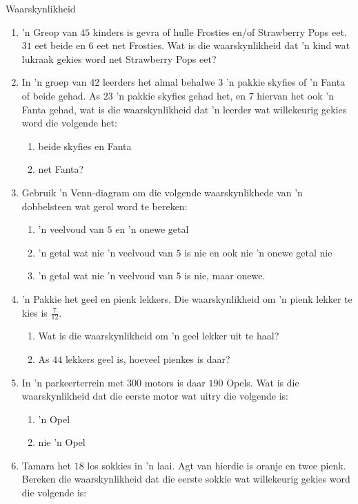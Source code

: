 \begin{eoexercises}{Waarskynlikheid}
  \begin{enumerate}[itemsep=5pt, label=\textbf{\arabic*}]
  \item 'n Greop van $45$ kinders is gevra of hulle  Frosties en/of
    Strawberry Pops eet. $31$ eet beide en $6$ eet net Frosties.  Wat is die waarskynlikheid dat 'n kind wat lukraak gekies word net Strawberry
    Pops eet?
  \item In 'n groep van $42$ leerders het almal behalwe $3$ 'n pakkie skyfies of 'n Fanta of beide gehad. As $23$ 'n pakkie skyfies gehad het, en $7$ hiervan het ook 'n Fanta gehad, wat is die waarskynlikheid dat 'n leerder wat willekeurig gekies word die volgende het:
    \begin{enumerate}
    \item beide skyfies en Fanta
    \item net Fanta?
    \end{enumerate}
  \item Gebruik 'n Venn-diagram om die volgende waarskynlikhede van 'n dobbelsteen wat gerol word te bereken:
    \begin{enumerate}
    \item 'n veelvoud van $5$ en 'n onewe getal
    \item 'n getal wat nie 'n veelvoud van $5$ is nie en ook nie 'n onewe getal nie
    \item 'n getal wat nie 'n veelvoud van $5$ is nie, maar onewe.
    \end{enumerate}
  \item 'n Pakkie het geel en pienk lekkers. Die waarskynlikheid om 'n pienk lekker te kies is $\frac{7}{12}$.
    \begin{enumerate}
    \item Wat is die waarskynlikheid om 'n geel lekker uit te haal?
    \item As $44$ lekkers geel is, hoeveel pienkes is daar?
    \end{enumerate}
  \item In 'n parkeerterrein met $300$ motors is daar $190$ Opels. Wat is die waarskynlikheid dat die eerste motor wat uitry die volgende is:
    \begin{enumerate}
    \item 'n Opel
    \item nie 'n Opel
    \end{enumerate}
  \item Tamara het $18$ los sokkies in 'n laai. Agt van hierdie is oranje en twee pienk. Bereken die waarskynlikheid dat die eerste sokkie wat willekeurig gekies word die volgende is:

\end{enumerate}
\end{eoexercises}
